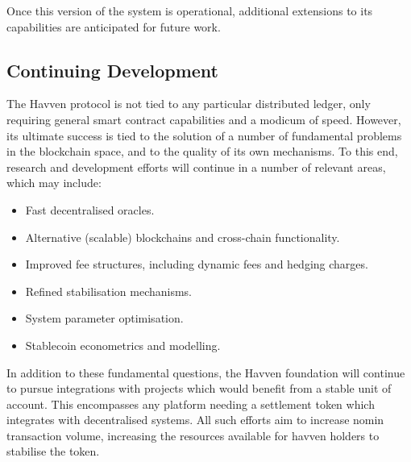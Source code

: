 \noindent Once this version of the system is operational, additional extensions to its
capabilities are anticipated for future work. \\


\subsection{Continuing Development}

\noindent The Havven protocol is not tied to any particular distributed ledger,
only requiring general smart contract capabilities and a modicum of speed.
However, its ultimate success is tied to the solution of a number of
fundamental problems in the blockchain space, and to the quality of its own
mechanisms. To this end, research and development efforts will continue in a
number of relevant areas, which may include:

\begin{itemize}
    \item Fast decentralised oracles.
    \item Alternative (scalable) blockchains and cross-chain functionality.
    \item Improved fee structures, including dynamic fees and hedging charges.
    \item Refined stabilisation mechanisms.
    \item System parameter optimisation.
    \item Stablecoin econometrics and modelling.
\end{itemize}

\noindent In addition to these fundamental questions, the Havven foundation will continue
to pursue integrations with projects which would benefit from a stable unit of
account. This encompasses any platform needing a settlement token which
integrates with decentralised systems. All such efforts aim to increase nomin
transaction volume, increasing the resources available for havven holders to
stabilise the token.
